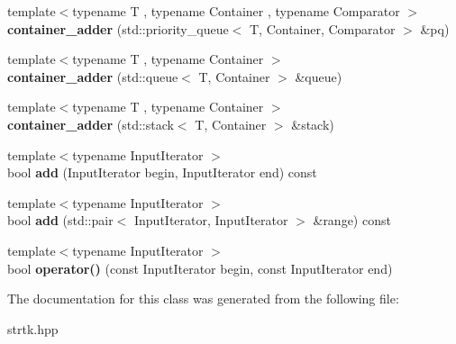 \begin{DoxyCompactItemize}
\item 
\hypertarget{classstrtk_1_1details_1_1container__adder_a068c465f787db3f6de24eb81b6c2e803}{{\footnotesize template$<$typename T , typename Container , typename Comparator $>$ }\\{\bfseries container\-\_\-adder} (std\-::priority\-\_\-queue$<$ T, Container, Comparator $>$ \&pq)}\label{classstrtk_1_1details_1_1container__adder_a068c465f787db3f6de24eb81b6c2e803}

\item 
\hypertarget{classstrtk_1_1details_1_1container__adder_a2226802e2952db90be699f8fa826514a}{{\footnotesize template$<$typename T , typename Container $>$ }\\{\bfseries container\-\_\-adder} (std\-::queue$<$ T, Container $>$ \&queue)}\label{classstrtk_1_1details_1_1container__adder_a2226802e2952db90be699f8fa826514a}

\item 
\hypertarget{classstrtk_1_1details_1_1container__adder_a263bbe26359b3fa928c976f89a3ef299}{{\footnotesize template$<$typename T , typename Container $>$ }\\{\bfseries container\-\_\-adder} (std\-::stack$<$ T, Container $>$ \&stack)}\label{classstrtk_1_1details_1_1container__adder_a263bbe26359b3fa928c976f89a3ef299}

\item 
\hypertarget{classstrtk_1_1details_1_1container__adder_a3256901100af9f1f7a9c648401fa79e1}{{\footnotesize template$<$typename Input\-Iterator $>$ }\\bool {\bfseries add} (Input\-Iterator begin, Input\-Iterator end) const }\label{classstrtk_1_1details_1_1container__adder_a3256901100af9f1f7a9c648401fa79e1}

\item 
\hypertarget{classstrtk_1_1details_1_1container__adder_ac8784f29a4bfd5ff3fa3592dea645860}{{\footnotesize template$<$typename Input\-Iterator $>$ }\\bool {\bfseries add} (std\-::pair$<$ Input\-Iterator, Input\-Iterator $>$ \&range) const }\label{classstrtk_1_1details_1_1container__adder_ac8784f29a4bfd5ff3fa3592dea645860}

\item 
\hypertarget{classstrtk_1_1details_1_1container__adder_afd18fff9a1326a6a826a257e79df2c6f}{{\footnotesize template$<$typename Input\-Iterator $>$ }\\bool {\bfseries operator()} (const Input\-Iterator begin, const Input\-Iterator end)}\label{classstrtk_1_1details_1_1container__adder_afd18fff9a1326a6a826a257e79df2c6f}

\end{DoxyCompactItemize}


The documentation for this class was generated from the following file\-:\begin{DoxyCompactItemize}
\item 
strtk.\-hpp\end{DoxyCompactItemize}
